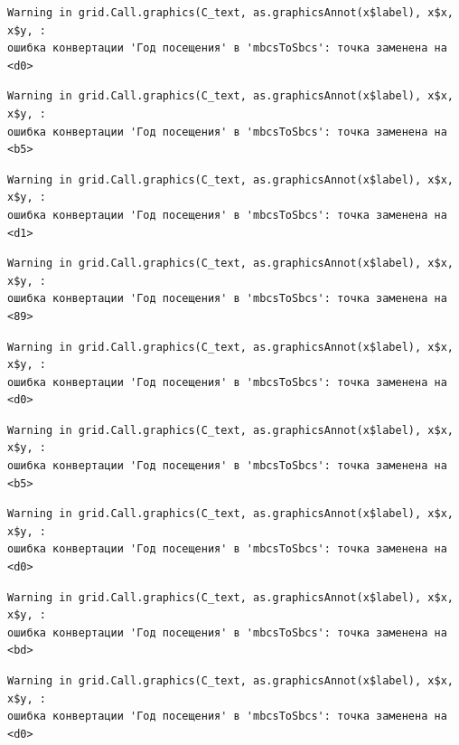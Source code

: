 \documentclass[
  letterpaper,
  DIV=11,
  numbers=noendperiod]{scrreprt}
\begin{document}
\begin{verbatim}
Warning in grid.Call.graphics(C_text, as.graphicsAnnot(x$label), x$x, x$y, :
ошибка конвертации 'Год посещения' в 'mbcsToSbcs': точка заменена на <d0>
\end{verbatim}

\begin{verbatim}
Warning in grid.Call.graphics(C_text, as.graphicsAnnot(x$label), x$x, x$y, :
ошибка конвертации 'Год посещения' в 'mbcsToSbcs': точка заменена на <b5>
\end{verbatim}

\begin{verbatim}
Warning in grid.Call.graphics(C_text, as.graphicsAnnot(x$label), x$x, x$y, :
ошибка конвертации 'Год посещения' в 'mbcsToSbcs': точка заменена на <d1>
\end{verbatim}

\begin{verbatim}
Warning in grid.Call.graphics(C_text, as.graphicsAnnot(x$label), x$x, x$y, :
ошибка конвертации 'Год посещения' в 'mbcsToSbcs': точка заменена на <89>
\end{verbatim}

\begin{verbatim}
Warning in grid.Call.graphics(C_text, as.graphicsAnnot(x$label), x$x, x$y, :
ошибка конвертации 'Год посещения' в 'mbcsToSbcs': точка заменена на <d0>
\end{verbatim}

\begin{verbatim}
Warning in grid.Call.graphics(C_text, as.graphicsAnnot(x$label), x$x, x$y, :
ошибка конвертации 'Год посещения' в 'mbcsToSbcs': точка заменена на <b5>
\end{verbatim}

\begin{verbatim}
Warning in grid.Call.graphics(C_text, as.graphicsAnnot(x$label), x$x, x$y, :
ошибка конвертации 'Год посещения' в 'mbcsToSbcs': точка заменена на <d0>
\end{verbatim}

\begin{verbatim}
Warning in grid.Call.graphics(C_text, as.graphicsAnnot(x$label), x$x, x$y, :
ошибка конвертации 'Год посещения' в 'mbcsToSbcs': точка заменена на <bd>
\end{verbatim}

\begin{verbatim}
Warning in grid.Call.graphics(C_text, as.graphicsAnnot(x$label), x$x, x$y, :
ошибка конвертации 'Год посещения' в 'mbcsToSbcs': точка заменена на <d0>
\end{verbatim}
\end{document}
